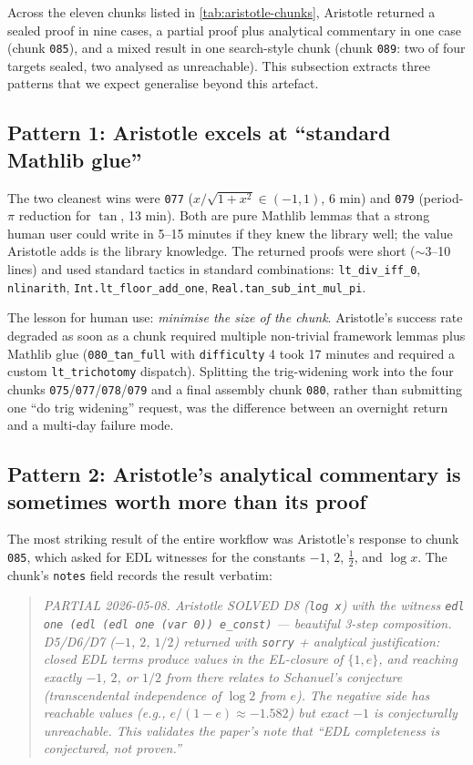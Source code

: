 \documentclass[11pt,a4paper]{article}
\theoremstyle{plain}
\theoremstyle{definition}
\begin{document}
Across the eleven chunks listed in \cref{tab:aristotle-chunks},
Aristotle returned a sealed proof in nine cases, a partial proof
plus analytical commentary in one case (chunk \texttt{085}), and a
mixed result in one search-style chunk (chunk \texttt{089}: two of
four targets sealed, two analysed as unreachable). This subsection
extracts three patterns that we expect generalise beyond this
artefact.

\subsection*{Pattern 1: Aristotle excels at ``standard Mathlib glue''}

The two cleanest wins were \texttt{077} ($x/\sqrt{1 + x^2} \in
(-1, 1)$, 6 min) and \texttt{079} (period-$\pi$ reduction for $\tan$,
13 min). Both are pure Mathlib lemmas that a strong human user could
write in 5--15 minutes if they knew the library well; the value
Aristotle adds is the library knowledge. The returned proofs were
short ($\sim$3--10 lines) and used standard tactics in standard
combinations: \texttt{lt\_div\_iff\_0}, \texttt{nlinarith},
\texttt{Int.lt\_floor\_add\_one}, \texttt{Real.tan\_sub\_int\_mul\_pi}.

The lesson for human use: \emph{minimise the size of the chunk}.
Aristotle's success rate degraded as soon as a chunk required
multiple non-trivial framework lemmas plus Mathlib glue
(\texttt{080\_tan\_full} with \texttt{difficulty} 4 took 17 minutes
and required a custom \texttt{lt\_trichotomy} dispatch). Splitting
the trig-widening work into the four chunks
\texttt{075}/\texttt{077}/\texttt{078}/\texttt{079} and a final
assembly chunk \texttt{080}, rather than submitting one
``do trig widening'' request, was the difference between an
overnight return and a multi-day failure mode.

\subsection*{Pattern 2: Aristotle's analytical commentary is sometimes
worth more than its proof}

The most striking result of the entire workflow was Aristotle's
response to chunk \texttt{085}, which asked for EDL witnesses for the
constants $-1$, $2$, $\tfrac{1}{2}$, and $\log x$. The chunk's
\texttt{notes} field records the result verbatim:

\begin{quote}\itshape\small
PARTIAL 2026-05-08. Aristotle SOLVED D8 (\texttt{log x}) with the
witness \texttt{edl one (edl (edl one (var 0)) e\_const)} --- beautiful
3-step composition. D5/D6/D7 ($-1$, $2$, $1/2$) returned with
\texttt{sorry} + analytical justification: closed EDL terms produce
values in the EL-closure of $\{1, e\}$, and reaching exactly $-1$,
$2$, or $1/2$ from there relates to Schanuel's conjecture
(transcendental independence of $\log 2$ from $e$). The negative side
has reachable values (e.g., $e/(1 - e) \approx -1.582$) but exact
$-1$ is conjecturally unreachable. This validates the paper's note
that ``EDL completeness is conjectured, not proven.''
\end{quote}
\end{document}
